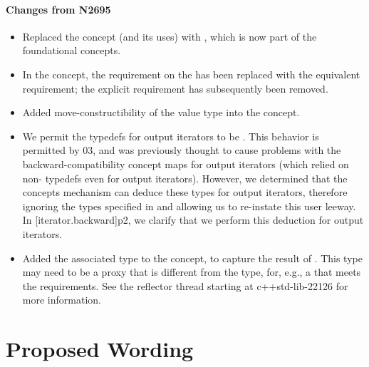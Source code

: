 \documentclass[american,twoside]{book}
\begin{document}
\begin{titlepage}
\paragraph*{Changes from N2695}
\begin{itemize}
\item Replaced the  concept (and its uses) with
  , which is now part of the foundational concepts.
\item In the  concept, the
   requirement on the  has
  been replaced with the equivalent  requirement;
  the explicit  requirement has
  subsequently been removed.
\item Added move-constructibility of the value type into the
   concept.
\item We permit the  typedefs for output
  iterators to be . This behavior is permitted by
  \Cpp{}03, and was previously thought to cause problems with the
  backward-compatibility concept maps for output iterators (which
  relied on non- typedefs even for output
  iterators). However, we determined that the concepts mechanism can
  deduce these types for output iterators, therefore ignoring the
  types specified in  and allowing us to
  re-instate this user leeway. In [iterator.backward]p2, we clarify
  that we perform this deduction for output iterators.
\item Added the  associated type to the
   concept, to capture the result of
  . This type may need to be a proxy that is
  different from the  type, for, e.g., a
   that meets the 
   requirements. See the reflector thread
  starting at c++std-lib-22126 for more information.
\end{itemize}


\end{titlepage}

\section*{Proposed Wording}
\end{document}

